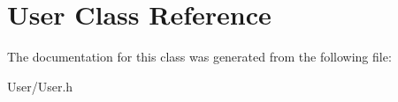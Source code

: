 \hypertarget{class_user}{\section{User Class Reference}
\label{class_user}
}


The documentation for this class was generated from the following file\-:\begin{DoxyCompactItemize}
\item 
User/User.\-h\end{DoxyCompactItemize}
